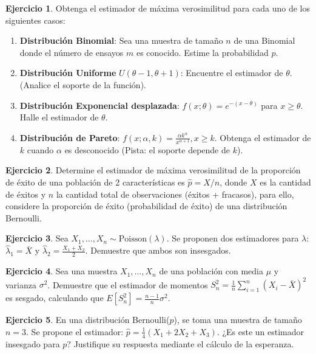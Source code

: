 \documentclass[
  11pt,
]{book}
\theoremstyle{definition}
\theoremstyle{definition}
\theoremstyle{definition}
\newtheorem{exercise}{Ejercicio}[chapter]
\theoremstyle{definition}
\theoremstyle{remark}
\begin{document}
\begin{exercise}

Obtenga el estimador de máxima verosimilitud para cada uno de los siguientes casos:

\begin{enumerate}
\def\labelenumi{\arabic{enumi}.}
\item
  \textbf{Distribución Binomial}: Sea una muestra de tamaño \(n\) de una Binomial donde el número de ensayos \(m\) es conocido. Estime la probabilidad \(p\).
\item
  \textbf{Distribución Uniforme} \(U(\theta-1, \theta+1)\): Encuentre el estimador de \(\theta\). (Analice el soporte de la función).
\item
  \textbf{Distribución Exponencial desplazada}: \(f(x; \theta) = e^{-(x-\theta)}\) para \(x \geq \theta\). Halle el estimador de \(\theta\).
\item
  \textbf{Distribución de Pareto}: \(f(x; \alpha, k) = \frac{\alpha k^\alpha}{x^{\alpha+1}}, x \geq k\). Obtenga el estimador de \(k\) cuando \(\alpha\) es desconocido (Pista: el soporte depende de \(k\)).
\end{enumerate}

\end{exercise}

\begin{exercise}
Determine el estimador de máxima verosimilitud de la proporción de éxito de una población de 2 características es \(\widehat{p} = X/n\), donde \(X\) es la cantidad de éxitos y \(n\) la cantidad total de observaciones (éxitos + fracasos), para ello, considere la proporción de éxito (probabilidad de éxito) de una distribución Bernoulli.
\end{exercise}

\begin{exercise}
Sea \(X_1, \dots, X_n \sim \text{Poisson}(\lambda)\). Se proponen dos estimadores para \(\lambda\): \(\hat{\lambda}_1 = \bar{X}\) y \(\hat{\lambda}_2 = \frac{X_1 + X_2}{2}\). Demuestre que ambos son insesgados.
\end{exercise}

\begin{exercise}
Sea una muestra \(X_1, \dots, X_n\) de una población con media \(\mu\) y varianza \(\sigma^2\). Demuestre que el estimador de momentos \(S_n^2 = \frac{1}{n} \sum_{i=1}^n (X_i - \bar{X})^2\) es sesgado, calculando que \(E[S_n^2] = \frac{n-1}{n}\sigma^2\).
\end{exercise}

\begin{exercise}
En una distribución Bernoulli(\(p\)), se toma una muestra de tamaño \(n=3\). Se propone el estimador: \(\hat{p} = \frac{1}{4}(X_1 + 2X_2 + X_3)\). ¿Es este un estimador insesgado para \(p\)? Justifique su respuesta mediante el cálculo de la esperanza.
\end{exercise}
\end{document}
